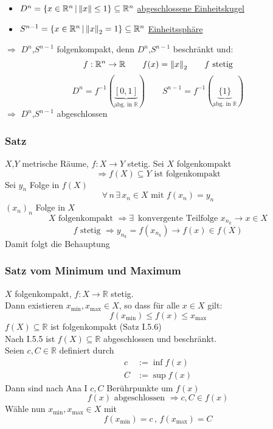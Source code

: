 \begin{itemize}
	\item $D^n = \{ x \in \mathbb{R}^n \, | \, \norm{x} \leq 1 \} \subseteq \mathbb{R}^n$ \qquad \underline{abgeschlossene Einheitskugel}
	\item $S^{n-1}= \{ x \in \mathbb{R}^n \, | \, \norm{x}_2=1 \} \subseteq \mathbb{R}^n$ \qquad \underline{Einheitssphäre}
\end{itemize}
$\Rightarrow$ $D^n$,$S^{n-1}$ folgenkompakt, denn $D^n$,$S^{n-1}$ beschränkt und:
\[
	f: \mathbb{R}^n \to \mathbb{R} \qquad f(x)=\norm{x}_2 \qquad f \text{ stetig}
\]
\[
	D^n = f^{-1}(\underset{\text{abg. in $\mathbb{R}$}}{\underbrace{[0,1]}}) \qquad S^{n-1}=f^{-1}(\underset{\text{abg. in $\mathbb{R}$}}{\underbrace{\{1\}}})
\]
$\Rightarrow$ $D^n$,$S^{n-1}$ abgeschlossen

\subsubsection{Satz} %
\label{ssub:satz}
$X$,$Y$ metrische Räume, $f: X \to Y$ stetig. Sei $X$ folgenkompakt 
\[
	\Rightarrow f(X) \subseteq Y \text{ ist folgenkompakt}
\]
Sei $y_n$ Folge in $f(X)$ \\
\[ \forall\, n \, \exists\, x_n \in X \text{ mit } f(x_n)=y_n \] 
$(x_n)_n$ Folge in $X$
\[
	X \text{ folgenkompakt } \Rightarrow  \exists\, \text{ konvergente Teilfolge } x_{n_k} \to x \in X
\]
\[
	f \text{ stetig } \Rightarrow y_{n_k} = f(x_{n_k}) \to f(x) \in f(X)
\]
Damit folgt die Behauptung
\bewende

\subsubsection{Satz vom Minimum und Maximum} %
\label{ssub:satz_vom_minimum_und_maximum}
$X$ folgenkompakt, $f: X \to \mathbb{R}$ stetig. \\ Dann existieren $x_{\min},x_{\max} \in X$, so dass für alle $x \in X$ gilt:
\[
	f(x_{\min}) \leq f(x) \leq x_{\max}
\]
$f(X) \subseteq \mathbb{R}$ ist folgenkompakt (Satz I.5.6) \\
Nach I.5.5 ist $f(X) \subseteq \mathbb{R}$ abgeschlossen und beschränkt. \\
Seien $c,C \in \mathbb{R}$ definiert durch
\begin{align*}
	c &:= \inf f(x) \\
	C &:= \sup f(x)
\end{align*}
Dann sind nach Ana I $c,C$ Berührpunkte um $f(x)$
\[
	f(x) \text{ abgeschlossen } \Rightarrow c,C \in f(x)
\]
Wähle nun $x_{\min},x_{\max} \in X$ mit
\[
	f(x_{\min})=c \,,\,f(x_{\max})=C
\] \bewende

